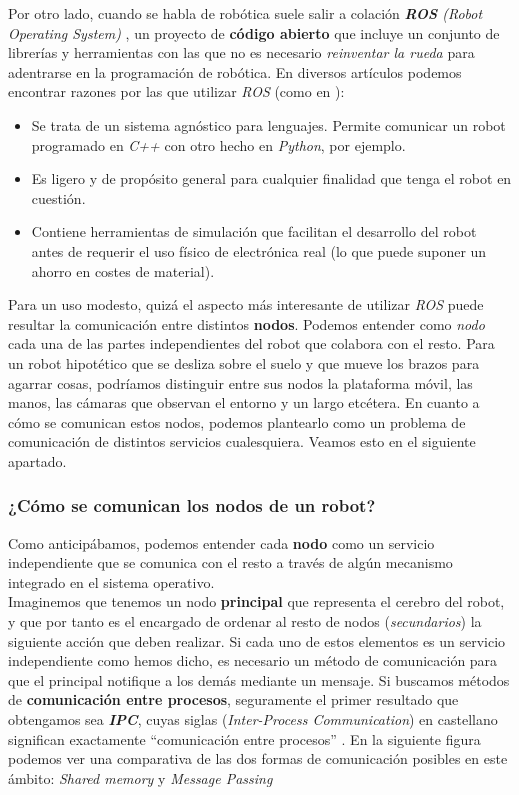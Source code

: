 Por otro lado, cuando se habla de robótica suele salir a colación \textit{\textbf{ROS} (Robot Operating System)} \cite{why-ros}, un proyecto de \textbf{código abierto} que incluye un conjunto de librerías y herramientas con las que no es necesario \textit{reinventar la rueda} para adentrarse en la programación de robótica. En diversos artículos podemos encontrar razones por las que utilizar \textit{ROS} (como en \cite{reasons-ros}):

\begin{itemize}
	\item Se trata de un sistema agnóstico para lenguajes. Permite comunicar un robot programado en \textit{C++} con otro hecho en \textit{Python}, por ejemplo.
	\item Es ligero y de propósito general para cualquier finalidad que tenga el robot en cuestión.
	\item Contiene herramientas de simulación que facilitan el desarrollo del robot antes de requerir el uso físico de electrónica real (lo que puede suponer un ahorro en costes de material).
\end{itemize}

Para un uso modesto, quizá el aspecto más interesante de utilizar \textit{ROS} puede resultar la comunicación entre distintos \textbf{nodos}. Podemos entender como \textit{nodo} cada una de las partes independientes del robot que colabora con el resto. Para un robot hipotético que se desliza sobre el suelo y que mueve los brazos para agarrar cosas, podríamos distinguir entre sus nodos la plataforma móvil, las manos, las cámaras que observan el entorno y un largo etcétera. En cuanto a cómo se comunican estos nodos, podemos plantearlo como un problema de comunicación de distintos servicios cualesquiera. Veamos esto en el siguiente apartado.\\


\subsubsection{¿Cómo se comunican los nodos de un robot?}

Como anticipábamos, podemos entender cada \textbf{nodo} como un servicio independiente que se comunica con el resto a través de algún mecanismo integrado en el sistema operativo.\\

Imaginemos que tenemos un nodo \textbf{principal} que representa el cerebro del robot, y que por tanto es el encargado de ordenar al resto de nodos (\textit{secundarios}) la siguiente acción que deben realizar. Si cada uno de estos elementos es un servicio independiente como hemos dicho, es necesario un método de comunicación para que el principal notifique a los demás mediante un mensaje. Si buscamos métodos de \textbf{comunicación entre procesos}, seguramente el primer resultado que obtengamos sea \textbf{\textit{IPC}}, cuyas siglas (\textit{Inter-Process Communication}) en castellano significan exactamente ``comunicación entre procesos'' \cite{ipc}. En la siguiente figura podemos ver una comparativa de las dos formas de comunicación posibles en este ámbito: \textit{Shared memory} y \textit{Message Passing}\\

